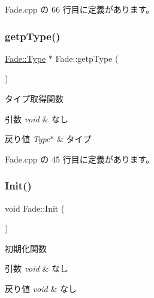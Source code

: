  Fade.\+cpp の 66 行目に定義があります。

\mbox{\label{class_fade_a098d3f7b05dbcdecb185c6cce5bbcec0}} 
\subsubsection{\texorpdfstring{getp\+Type()}{getpType()}}
{\footnotesize\ttfamily \mbox{\hyperlink{class_fade_ac06f27215b454aa05b93c236476d6e80}{Fade\+::\+Type}} $\ast$ Fade\+::getp\+Type (\begin{DoxyParamCaption}{ }\end{DoxyParamCaption})}



タイプ取得関数 


\begin{DoxyParams}{引数}
{\em void} & なし \\
\hline
\end{DoxyParams}

\begin{DoxyRetVals}{戻り値}
{\em Type$\ast$} & タイプ \\
\hline
\end{DoxyRetVals}


 Fade.\+cpp の 45 行目に定義があります。

\mbox{\label{class_fade_ac2a47819e1390abcae3259bcb42bddf5}} 
\subsubsection{\texorpdfstring{Init()}{Init()}}
{\footnotesize\ttfamily void Fade\+::\+Init (\begin{DoxyParamCaption}{ }\end{DoxyParamCaption})\hspace{0.3cm}{\ttfamily [virtual]}}



初期化関数 


\begin{DoxyParams}{引数}
{\em void} & なし \\
\hline
\end{DoxyParams}

\begin{DoxyRetVals}{戻り値}
{\em void} & なし \\
\hline
\end{DoxyRetVals}


